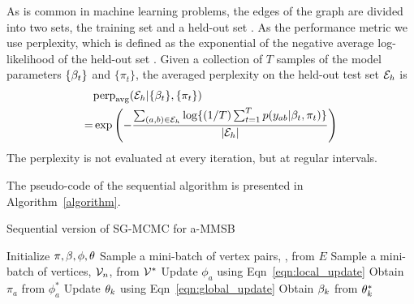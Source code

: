 As is common in machine learning problems, the edges of the graph are divided
into two sets, the training set and a held-out set \Heldout.
As the performance metric we use perplexity, which is defined as the exponential
of the negative average log-likelihood of the held-out set \Heldout. Given a collection of $T$
samples of the model parameters $\{\beta_t\}$ and $\{\pi_t\}$, the averaged
perplexity on the held-out test set $\Heldout$ is 
\begin{align}
&\text{perp}_{\text{avg}}(\Heldout|\{\beta_t\},\{\pi_t\})\nonumber \\=&
\exp\left(-\frac{\sum_{(a,b)\in \Heldout}^{}\log
\{(1/T)\sm{t}{T}p(y_{ab}|\beta_t,\pi_t)\}}{|\cE_{h}|}\right)
\end{align}
The perplexity is not evaluated at every iteration, but at regular intervals.

The pseudo-code of the sequential algorithm is presented in Algorithm~\ref{algorithm}. 

\begin{algorithm}[t]
\caption{Sequential version of SG-MCMC for a-MMSB}\label{alg}
\begin{algorithmic}[1]
\STATE Initialize $\pi , \beta, \phi, \theta$
\STATE Sample a mini-batch of vertex pairs, \Minibatch, from $E$
	\STATE Sample a mini-batch of vertices, $\Neighbors$, from $\Vertices$
    \STATE Update $\phi_{a}$ using Eqn~\ref{eqn:local_update}
    \STATE Obtain $\pi_a$ from $\phi_a^*$ \ENDFOR
{}
    \STATE Update $\theta_{k}$ using Eqn~\ref{eqn:global_update}
    \STATE Obtain $\beta_k$ from $\theta_k^*$
\ENDFOR
\ENDWHILE
\end{algorithmic}
\label{algorithm}
\end{algorithm}


